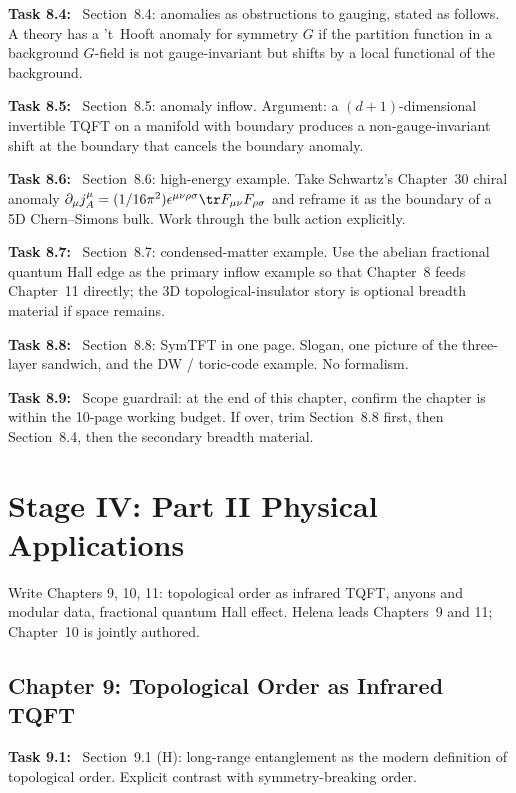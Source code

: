 \documentclass[11pt]{article}
\newcommand{\task}[1]{\medskip\noindent\textbf{Task #1:}\ }
\begin{document}
\task{8.4} Section~8.4: anomalies as obstructions to gauging, stated as follows.
A theory has a 't~Hooft anomaly for symmetry $G$ if the partition function in a
background $G$-field is not gauge-invariant but shifts by a local functional of
the background.

\task{8.5} Section~8.5: anomaly inflow.
Argument: a $(d+1)$-dimensional invertible TQFT on a manifold with boundary produces a
non-gauge-invariant shift at the boundary that cancels the boundary anomaly.

\task{8.6} Section~8.6: high-energy example. Take Schwartz's Chapter~30 chiral anomaly
$\partial_\mu j^\mu_A = (1/16\pi^2)\epsilon^{\mu\nu\rho\sigma}\tr F_{\mu\nu}F_{\rho\sigma}$
and reframe it as the boundary of a 5D Chern--Simons bulk. Work through the bulk action
explicitly.

\task{8.7} Section~8.7: condensed-matter example. Use the abelian fractional quantum Hall
edge as the primary inflow example so that Chapter~8 feeds Chapter~11 directly; the 3D
topological-insulator story is optional breadth material if space remains.

\task{8.8} Section~8.8: SymTFT in one page. Slogan, one picture of the three-layer
sandwich, and the DW / toric-code example. No formalism.

\task{8.9} Scope guardrail: at the end of this chapter, confirm the chapter is
within the 10-page working budget. If over, trim Section~8.8 first, then Section~8.4,
then the secondary breadth material.

\section{Stage IV: Part II Physical Applications}\label{sec:stageIV}

\begin{goalbox}[Objective]
Write Chapters 9, 10, 11: topological order as infrared TQFT, anyons and modular data,
fractional quantum Hall effect. Helena leads Chapters~9 and 11; Chapter~10 is jointly
authored.
\end{goalbox}

\subsection{Chapter 9: Topological Order as Infrared TQFT}

\task{9.1} Section~9.1 (H): long-range entanglement as the modern definition of
topological order. Explicit contrast with symmetry-breaking order.
\end{document}
